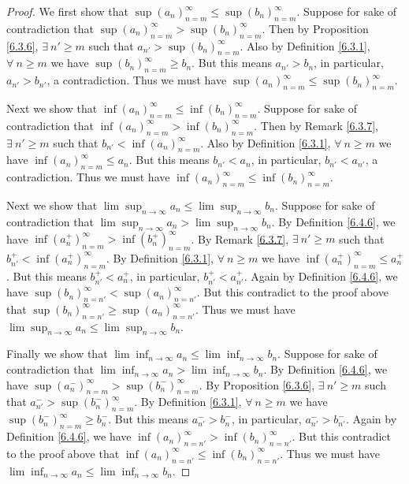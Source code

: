\begin{proof}
We first show that \(\sup(a_n)_{n = m}^\infty \leq \sup(b_n)_{n = m}^\infty\).
Suppose for sake of contradiction that \(\sup(a_n)_{n = m}^\infty > \sup(b_n)_{n = m}^\infty\).
Then by Proposition \ref{6.3.6}, \(\exists\ n' \geq m\) such that \(a_{n'} > \sup(b_n)_{n = m}^\infty\).
Also by Definition \ref{6.3.1}, \(\forall\ n \geq m\) we have \(\sup(b_n)_{n = m}^\infty \geq b_n\).
But this means \(a_{n'} > b_n\), in particular, \(a_{n'} > b_{n'}\), a contradiction.
Thus we must have \(\sup(a_n)_{n = m}^\infty \leq \sup(b_n)_{n = m}^\infty\).

Next we show that \(\inf(a_n)_{n = m}^\infty \leq \inf(b_n)_{n = m}^\infty\).
Suppose for sake of contradiction that \(\inf(a_n)_{n = m}^\infty > \inf(b_n)_{n = m}^\infty\).
Then by Remark \ref{6.3.7}, \(\exists\ n' \geq m\) such that \(b_{n'} < \inf(a_n)_{n = m}^\infty\).
Also by Definition \ref{6.3.1}, \(\forall\ n \geq m\) we have \(\inf(a_n)_{n = m}^\infty \leq a_n\).
But this means \(b_{n'} < a_n\), in particular, \(b_{n'} < a_{n'}\), a contradiction.
Thus we must have \(\inf(a_n)_{n = m}^\infty \leq \inf(b_n)_{n = m}^\infty\).

Next we show that \(\lim\sup_{n \to \infty} a_n \leq \lim\sup_{n \to \infty} b_n\).
Suppose for sake of contradiction that \(\lim\sup_{n \to \infty} a_n > \lim\sup_{n \to \infty} b_n\).
By Definition \ref{6.4.6}, we have \(\inf(a_n^+)_{n = m}^\infty > \inf(b_n^+)_{n = m}^\infty\).
By Remark \ref{6.3.7}, \(\exists\ n' \geq m\) such that \(b_{n'}^+ < \inf(a_n^+)_{n = m}^\infty\).
By Definition \ref{6.3.1}, \(\forall\ n \geq m\) we have \(\inf(a_n^+)_{n = m}^\infty \leq a_n^+\).
But this means \(b_{n'}^+ < a_n^+\), in particular, \(b_{n'}^+ < a_{n'}^+\).
Again by Definition \ref{6.4.6}, we have \(\sup(b_n)_{n = n'}^\infty < \sup(a_n)_{n = n'}^\infty\).
But this contradict to the proof above that \(\sup(b_n)_{n = n'}^\infty \geq \sup(a_n)_{n = n'}^\infty\).
Thus we must have \(\lim\sup_{n \to \infty} a_n \leq \lim\sup_{n \to \infty} b_n\).

Finally we show that \(\lim\inf_{n \to \infty} a_n \leq \lim\inf_{n \to \infty} b_n\).
Suppose for sake of contradiction that \(\lim\inf_{n \to \infty} a_n > \lim\inf_{n \to \infty} b_n\).
By Definition \ref{6.4.6}, we have \(\sup(a_n^-)_{n = m}^\infty > \sup(b_n^-)_{n = m}^\infty\).
By Proposition \ref{6.3.6}, \(\exists\ n' \geq m\) such that \(a_{n'}^- > \sup(b_n^-)_{n = m}^\infty\).
By Definition \ref{6.3.1}, \(\forall\ n \geq m\) we have \(\sup(b_n^-)_{n = m}^\infty \geq b_n^-\).
But this means \(a_{n'}^- > b_n^-\), in particular, \(a_{n'}^- > b_{n'}^-\).
Again by Definition \ref{6.4.6}, we have \(\inf(a_n)_{n = n'}^\infty > \inf(b_n)_{n = n'}^\infty\).
But this contradict to the proof above that \(\inf(a_n)_{n = n'}^\infty \leq \inf(b_n)_{n = n'}^\infty\).
Thus we must have \(\lim\inf_{n \to \infty} a_n \leq \lim\inf_{n \to \infty} b_n\).
\end{proof}

